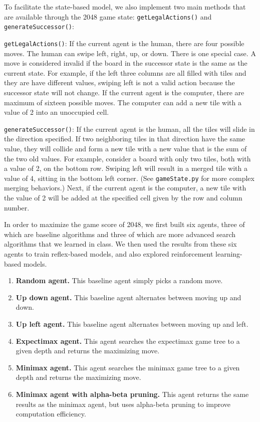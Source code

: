 \documentclass[9pt,twocolumn]{article}
\begin{document}
To facilitate the state-based model, we also implement two main methods that are available through the 2048 game state: \texttt{getLegalActions()} and \texttt{generateSuccessor()}:

\texttt{getLegalActions()}: If the current agent is the human, there are four possible moves. The human can swipe left, right, up, or down. There is one special case. A move is considered invalid if the board in the successor state is the same as the current state. For example, if the left three columns are all filled with tiles and they are have different values, swiping left is not a valid action because the successor state will not change. If the current agent is the computer, there are maximum of sixteen possible moves. The computer can add a new tile with a value of 2 into an unoccupied cell.

\texttt{generateSuccessor()}: If the current agent is the human, all the tiles will slide in the direction specified. If two neighboring tiles in that direction have the same value, they will collide and form a new tile with a new value that is the sum of the two old values. For example, consider a board with only two tiles, both with a value of 2, on the bottom row. Swiping left will result in a merged tile with a value of 4, sitting in the bottom left corner. (See \texttt{gameState.py} for more complex merging behaviors.) Next, if the current agent is the computer, a new tile with the value of 2 will be added at the specified cell given by the row and column number.

In order to maximize the game score of 2048, we first built six agents, three of which are baseline algorithms and three of which are more advanced search algorithms that we learned in class. We then used the results from these six agents to train reflex-based models, and also explored reinforcement learning-based models.

\begin{enumerate}[1)]

\item \textbf{Random agent.} This baseline agent simply picks a random move.

\item \textbf{Up down agent.} This baseline agent alternates between moving up and down.

\item \textbf{Up left agent.} This baseline agent alternates between moving up and left.

\item \textbf{Expectimax agent.} This agent searches the expectimax game tree to a given depth and returns the maximizing move.

\item \textbf{Minimax agent.} This agent searches the minimax game tree to a given depth and returns the maximizing move.

\item \textbf{Minimax agent with alpha-beta pruning.} This agent returns the same results as the minimax agent, but uses alpha-beta pruning to improve computation efficiency.

\end{enumerate}
\end{document}
